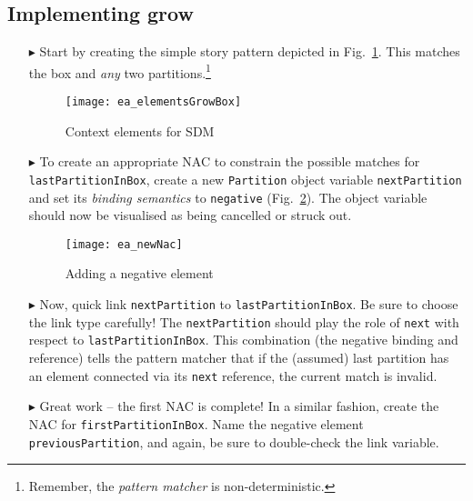 \newpage
\hypertarget{growBox vis}{}
\subsection{Implementing grow}
\visHeader

\begin{itemize}
 
\item[$\blacktriangleright$] Start by creating the simple story pattern depicted in Fig.~\ref{fig:sdm_grow_1}. This matches the box and \emph{any} two
partitions.\footnote{Remember, the \emph{pattern matcher} is non-deterministic.}

\vspace{0.5cm}

\begin{figure}[htbp]
\begin{center}
  \texttt{[image: ea\_elementsGrowBox]}
  \caption{Context elements for SDM}  
  \label{fig:sdm_grow_1}
\end{center}
\end{figure}

\item[$\blacktriangleright$] To create an appropriate \mbox{NAC} to constrain the possible matches for \texttt{lastPartitionInBox},  create a new
\texttt{Partition} object variable \texttt{next\-Part\-ition} and set its \emph{binding semantics} to \texttt{negative} (Fig.~\ref{fig:sdm_grow_2}). The object
variable should now be visualised as being cancelled or struck out.
 
\begin{figure}[htbp]
\begin{center}
  \texttt{[image: ea\_newNac]}
  \caption{Adding a negative element}  
  \label{fig:sdm_grow_2}
\end{center}
\end{figure}
 
\item[$\blacktriangleright$] Now, quick link \texttt{nextPartition} to \texttt{lastPartitionInBox}. Be sure to choose the link type carefully! The
\texttt{nextPartition} should play the role of \texttt{next} with respect to \texttt{lastPartitionInBox}. This combination (the negative binding and reference)
tells the pattern matcher that if the (assumed) last partition has an element connected via its \texttt{next} reference, the current match is invalid.

\item[$\blacktriangleright$] Great work -- the first NAC is complete! In a similar fashion, create the NAC for \texttt{firstPartitionInBox}. Name the
negative element \texttt{previousPartition}, and again, be sure to double-check the link variable.


\end{itemize}
